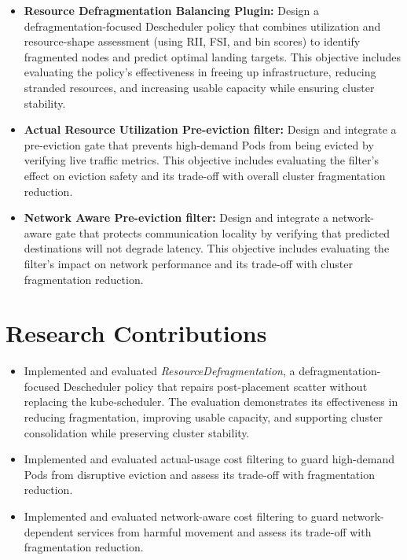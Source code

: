 \begin{itemize}
    \item \textbf{Resource Defragmentation Balancing Plugin:} Design a defragmentation-focused Descheduler policy that combines utilization and resource-shape assessment (using RII, FSI, and bin scores) to identify fragmented nodes and predict optimal landing targets. This objective includes evaluating the policy's effectiveness in freeing up infrastructure, reducing stranded resources, and increasing usable capacity while ensuring cluster stability.
    \item \textbf{Actual Resource Utilization Pre-eviction filter:} Design and integrate a pre-eviction gate that prevents high-demand Pods from being evicted by verifying live traffic metrics. This objective includes evaluating the filter's effect on eviction safety and its trade-off with overall cluster fragmentation reduction.
    \item \textbf{Network Aware Pre-eviction filter:} Design and integrate a network-aware gate that protects communication locality by verifying that predicted destinations will not degrade latency. This objective includes evaluating the filter's impact on network performance and its trade-off with cluster fragmentation reduction.
\end{itemize}

\section{Research Contributions}
\label{sec:researchContributions}

\begin{itemize}
    \item Implemented and evaluated \textit{ResourceDefragmentation}, a defragmentation-focused Descheduler policy that repairs post-placement scatter without replacing the kube-scheduler. The evaluation demonstrates its effectiveness in reducing fragmentation, improving usable capacity, and supporting cluster consolidation while preserving cluster stability.
    \item Implemented and evaluated actual-usage cost filtering to guard high-demand Pods from disruptive eviction and assess its trade-off with fragmentation reduction.
    \item Implemented and evaluated network-aware cost filtering to guard network-dependent services from harmful movement and assess its trade-off with fragmentation reduction.
\end{itemize}


